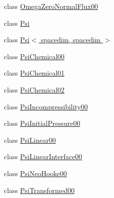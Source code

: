 \begin{DoxyCompactItemize}
\item 
class \hyperlink{classincremental_f_e_1_1_omega_zero_normal_flux00}{Omega\+Zero\+Normal\+Flux00}
\item 
class \hyperlink{classincremental_f_e_1_1_psi}{Psi}
\item 
class \hyperlink{classincremental_f_e_1_1_psi_3_01spacedim_00_01spacedim_01_4}{Psi$<$ spacedim, spacedim $>$}
\item 
class \hyperlink{classincremental_f_e_1_1_psi_chemical00}{Psi\+Chemical00}
\item 
class \hyperlink{classincremental_f_e_1_1_psi_chemical01}{Psi\+Chemical01}
\item 
class \hyperlink{classincremental_f_e_1_1_psi_chemical02}{Psi\+Chemical02}
\item 
class \hyperlink{classincremental_f_e_1_1_psi_incompressibility00}{Psi\+Incompressibility00}
\item 
class \hyperlink{classincremental_f_e_1_1_psi_initial_pressure00}{Psi\+Initial\+Pressure00}
\item 
class \hyperlink{classincremental_f_e_1_1_psi_linear00}{Psi\+Linear00}
\item 
class \hyperlink{classincremental_f_e_1_1_psi_linear_interface00}{Psi\+Linear\+Interface00}
\item 
class \hyperlink{classincremental_f_e_1_1_psi_neo_hooke00}{Psi\+Neo\+Hooke00}
\item 
class \hyperlink{classincremental_f_e_1_1_psi_transformed00}{Psi\+Transformed00}
\end{DoxyCompactItemize}
